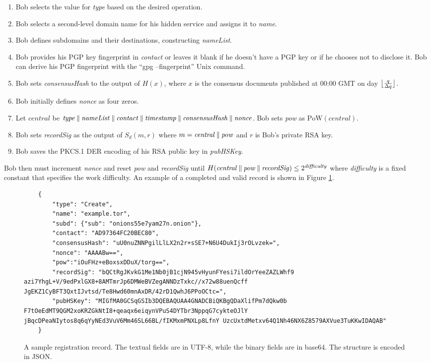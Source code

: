 \begin{enumerate}
	\item Bob selects the value for \emph{type} based on the desired operation.
	\item Bob selects a second-level domain name for his hidden service and assigns it to \emph{name}.
	\item Bob defines subdomains and their destinations, constructing \emph{nameList}.
	\item Bob provides his PGP key fingerprint in \emph{contact} or leaves it blank if he doesn't have a PGP key or if he chooses not to disclose it. Bob can derive his PGP fingerprint with the ``gpg --fingerprint'' Unix command.
	\item Bob sets \emph{consensusHash} to the output of $ H(x) $, where $ x $ is the consensus documents published at 00:00 GMT on day $ \floor[\big]{\frac{q}{\Delta q}} $.
	\item Bob initially defines \emph{nonce} as four zeros.
	\item Let $ \mathit{central} $ be $\mathit{type} \concat \mathit{nameList} \concat \mathit{contact} \concat \mathit{timestamp} \concat \mathit{consensusHash} \concat \mathit{nonce} $. Bob sets \emph{pow} as $ \mathrm{PoW}(\mathit{central}) $.
	\item Bob sets \emph{recordSig} as the output of $ S_{d}(m, r) $ where $ m = \mathit{central} \concat \mathit{pow} $ and $ r $ is Bob's private RSA key.
	\item Bob saves the PKCS.1 DER encoding of his RSA public key in \emph{pubHSKey}.
\end{enumerate}

Bob then must increment \emph{nonce} and reset \emph{pow} and \emph{recordSig} until $ H(\mathit{central} \concat \mathit{pow} \concat \mathit{recordSig}) \leq 2^{\mathit{difficulty}} $ where \emph{difficulty} is a fixed constant that specifies the work difficulty. An example of a completed and valid record is shown in Figure \ref{fig:sampleRecord}.

\begin{figure}
\begin{lstlisting}
	{
		"type": "Create",
		"name": "example.tor",
		"subd": {"sub": "onions55e7yam27n.onion"},
		"contact": "AD97364FC20BEC80",
		"consensusHash": "uU0nuZNNPgilLlLX2n2r+sSE7+N6U4DukIj3rOLvzek=",
		"nonce": "AAAABw==",
		"pow":"iOuFHz+eBoxsxDDuX/torg==",
		"recordSig": "bQCtRgJKvkG1Me1Nb0jB1cjN945vHyunFYesi7ildOrYeeZAZLWhf9 azi7YhgL+V/9edPxlGX8+8AMTmrJp6DMWeBVZegANNDzTxkc//x72w88uenQcff JgEKZ1CyBFT3QxtIJvtsd/Te8Hwd60mnAxDR/42rD1QwhJ6PPoOCtc=",		
		"pubHSKey": "MIGfMA0GCSqGSIb3DQEBAQUAA4GNADCBiQKBgQDaXlifPm7dQkw0b F7tOeEdMT9QGM2xoKRZGkNtI8+qeaqx6eiqynVPuS4DYTbr3NppqG7cykteOJlY jBqcDPeaNIytos8q6qYyNEd3VuV6Mm46SL66BL/fIKMxmPNXLp8LfnY UzcUxtdMetxv64Q1Nh46NX6Z8579AXVue3TuKKwIDAQAB"
	}
	\end{lstlisting}
	\caption{A sample registration record. The textual fields are in UTF-8, while the binary fields are in base64. The structure is encoded in JSON.}
	\label{fig:sampleRecord}
\end{figure}


